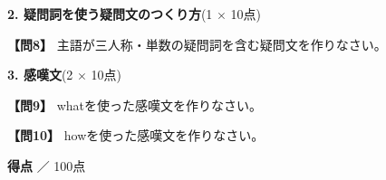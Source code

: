 \noindent\textbf{2. 疑問詞を使う疑問文のつくり方}(1 $\times$ 10点)

\noindent\textbf{【問8】} 主語が三人称・単数の疑問詞を含む疑問文を作りなさい。

\testqsep

\noindent\textbf{3. 感嘆文}(2 $\times$ 10点)

\noindent\textbf{【問9】} whatを使った感嘆文を作りなさい。

\testqsep

\noindent\textbf{【問10】} howを使った感嘆文を作りなさい。

\testqsep

\begin{flushright}
\textbf{得点} \underline{\hspace{8em}} ／ 100点
\end{flushright}
